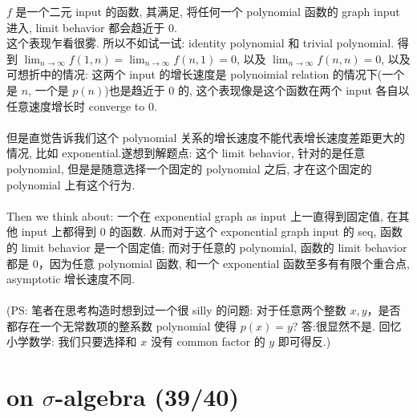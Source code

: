 \documentclass[lang=cn,11pt]{elegantbook}
\begin{document}
\begin{remark}
    $f$ 是一个二元 input 的函数, 其满足, 将任何一个 polynomial 函数的 graph input 进入, limit behavior 都会趋近于 0.\\ 这个表现乍看很雾. 所以不如试一试: identity polynomial 和 trivial polynomial. 得到 $\lim_{n \rightarrow \infty} f(1,n) = \lim_{n \rightarrow \infty} f(n,1) = 0$, 以及 $\lim_{n \rightarrow \infty} f(n,n) = 0$, 以及可想折中的情况: 这两个 input 的增长速度是 polynoimial relation 的情况下(一个是 $n$, 一个是 $p(n)$)也是趋近于 0 的, 这个表现像是这个函数在两个 input 各自以任意速度增长时 converge to 0.\\\\
    但是直觉告诉我们这个 polynomial 关系的增长速度不能代表增长速度差距更大的情况, 比如 exponential.遂想到解题点: 这个 limit behavior, 针对的是任意 polynomial, 但是是随意选择一个固定的 polynomial 之后, 才在这个固定的 polynomial 上有这个行为.\\\\
    Then we think about: 一个在 exponential graph as input 上一直得到固定值, 在其他 input 上都得到 0 的函数. 从而对于这个 exponential graph input 的 seq, 函数的 limit behavior 是一个固定值; 而对于任意的 polynomial, 函数的 limit behavior 都是 0，因为任意 polynomial 函数, 和一个 exponential 函数至多有有限个重合点, asymptotic 增长速度不同.\\\\
    (PS: 笔者在思考构造时想到过一个很 silly 的问题: 对于任意两个整数 $x,y$，是否都存在一个无常数项的整系数 polynomial 使得 $p(x) = y$? 答:很显然不是. 回忆小学数学: 我们只要选择和 $x$ 没有 common factor 的 $y$ 即可得反.)
\end{remark}




\chapter{on $\sigma$-algebra (39/40)}
\end{document}
